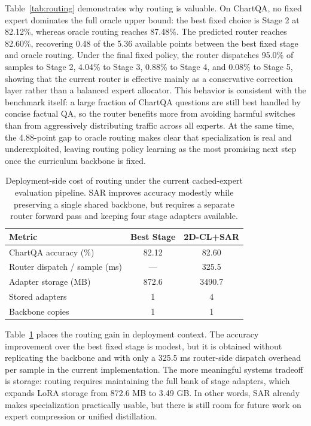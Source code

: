\documentclass[journal]{IEEEtran}
\newcommand{\method}{2D-CL}
\newcommand{\sar}{SAR}
\begin{document}
Table~\ref{tab:routing} demonstrates why routing is valuable.
On ChartQA, no fixed expert dominates the full oracle upper bound: the best fixed choice is Stage 2 at 82.12\%, whereas oracle routing reaches 87.48\%.
The predicted router reaches 82.60\%, recovering 0.48 of the 5.36 available points between the best fixed stage and oracle routing.
Under the final fixed policy, the router dispatches 95.0\% of samples to Stage 2, 4.04\% to Stage 3, 0.88\% to Stage 4, and 0.08\% to Stage 5, showing that the current router is effective mainly as a conservative correction layer rather than a balanced expert allocator.
This behavior is consistent with the benchmark itself: a large fraction of ChartQA questions are still best handled by concise factual QA, so the router benefits more from avoiding harmful switches than from aggressively distributing traffic across all experts.
At the same time, the 4.88-point gap to oracle routing makes clear that specialization is real and underexploited, leaving routing policy learning as the most promising next step once the curriculum backbone is fixed.

\begin{table}[!t]
\centering
\small
\begin{tabular}{lcc}
\toprule
\textbf{Metric} & \textbf{Best Stage} & \textbf{\method{}+\sar{}} \\
\midrule
ChartQA accuracy (\%) & 82.12 & 82.60 \\
Router dispatch / sample (ms) & --- & 325.5 \\
Adapter storage (MB) & 872.6 & 3490.7 \\
Stored adapters & 1 & 4 \\
Backbone copies & 1 & 1 \\
\bottomrule
\end{tabular}
\vspace{4pt}
\caption{Deployment-side cost of routing under the current cached-expert evaluation pipeline. \sar{} improves accuracy modestly while preserving a single shared backbone, but requires a separate router forward pass and keeping four stage adapters available.}
\label{tab:efficiency}
\end{table}

Table~\ref{tab:efficiency} places the routing gain in deployment context.
The accuracy improvement over the best fixed stage is modest, but it is obtained without replicating the backbone and with only a 325.5 ms router-side dispatch overhead per sample in the current implementation.
The more meaningful systems tradeoff is storage: routing requires maintaining the full bank of stage adapters, which expands LoRA storage from 872.6 MB to 3.49 GB.
In other words, \sar{} already makes specialization practically usable, but there is still room for future work on expert compression or unified distillation.
\end{document}
